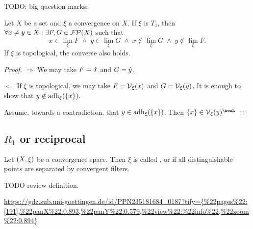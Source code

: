 TODO: big question marks:
\begin{proposition}
Let $X$ be a set and $\xi$ a convergence on $X$. If $\xi$ is $T_1$, then $\forall x\neq y\in X: \exists F,G\in \operatorname{\mathcal{FP}}(X)$ such that
\[ x\in \lim_\xi F \;\land\; y\in \lim_\xi G \;\land\; x\notin \lim_\xi G \;\land\; y\notin \lim_\xi F. \]
If $\xi$ is topological, the converse also holds.
\end{proposition}
\begin{proof}
$\Rightarrow$ We may take $F = \dot{x}$ and $G = \dot{y}$.

$\Leftarrow$ If $\xi$ is topological, we may take $F = \operatorname{\mathcal{V}}_\xi(x)$ and $G = \operatorname{\mathcal{V}}_\xi(y)$. It is enough to show that $y\notin \operatorname{adh}_\xi(\{x\})$.

Assume, towards a contradiction, that $y\in \operatorname{adh}_\xi(\{x\})$. Then $\{x\} \in \vicinities_\xi(y)^{\mesh}$
\end{proof}

\subsection{$R_1$ or reciprocal}
\begin{definition}
Let $\sSet{X,\xi}$ be a convergence space. Then $\xi$ is called ,  or  if all distinguishable points are separated by convergent filters.
\end{definition}
TODO review definition.

\url{https://gdz.sub.uni-goettingen.de/id/PPN235181684_0187?tify={%


